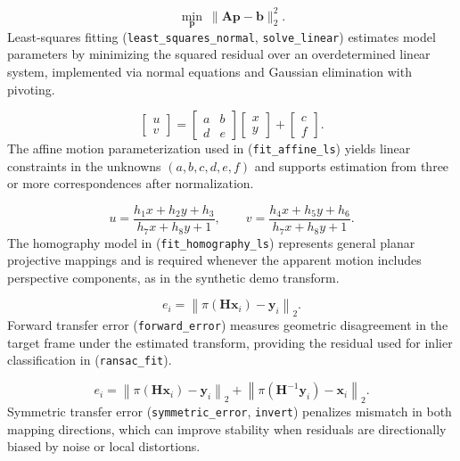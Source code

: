 \documentclass[11pt]{article}
\begin{document}
\begin{equation}
\min_{\mathbf{p}}\ \lVert \mathbf{A}\mathbf{p}-\mathbf{b}\rVert_2^2.
\end{equation}
Least-squares fitting (\texttt{least\_squares\_normal}, \texttt{solve\_linear}) estimates model parameters by minimizing the squared residual over an overdetermined linear system, implemented via normal equations and Gaussian elimination with pivoting.

\begin{equation}
\begin{bmatrix}u\\v\end{bmatrix}=
\begin{bmatrix}a&b\\d&e\end{bmatrix}
\begin{bmatrix}x\\y\end{bmatrix}
+
\begin{bmatrix}c\\f\end{bmatrix}.
\end{equation}
The affine motion parameterization used in (\texttt{fit\_affine\_ls}) yields linear constraints in the unknowns $(a,b,c,d,e,f)$ and supports estimation from three or more correspondences after normalization.

\begin{equation}
u=\frac{h_1x+h_2y+h_3}{h_7x+h_8y+1},\qquad
v=\frac{h_4x+h_5y+h_6}{h_7x+h_8y+1}.
\end{equation}
The homography model in (\texttt{fit\_homography\_ls}) represents general planar projective mappings and is required whenever the apparent motion includes perspective components, as in the synthetic demo transform.

\begin{equation}
e_i=\left\lVert \pi(\mathbf{H}\mathbf{x}_i)-\mathbf{y}_i\right\rVert_2.
\end{equation}
Forward transfer error (\texttt{forward\_error}) measures geometric disagreement in the target frame under the estimated transform, providing the residual used for inlier classification in (\texttt{ransac\_fit}).

\begin{equation}
e_i=\left\lVert \pi(\mathbf{H}\mathbf{x}_i)-\mathbf{y}_i\right\rVert_2+\left\lVert \pi(\mathbf{H}^{-1}\mathbf{y}_i)-\mathbf{x}_i\right\rVert_2.
\end{equation}
Symmetric transfer error (\texttt{symmetric\_error}, \texttt{invert}) penalizes mismatch in both mapping directions, which can improve stability when residuals are directionally biased by noise or local distortions.
\end{document}
